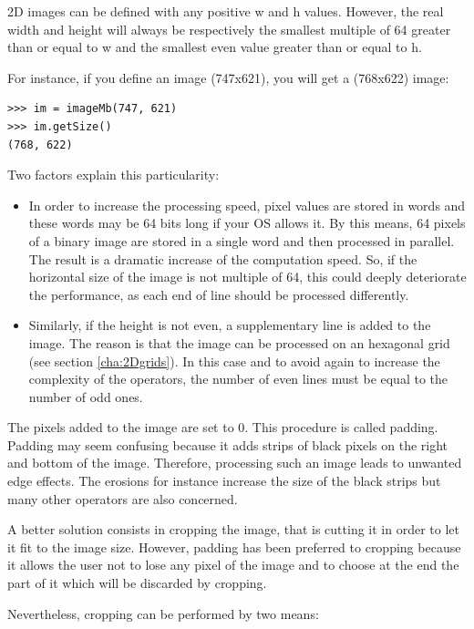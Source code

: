 \documentclass[a4paper,10pt,oneside]{article}
\begin{document}
2D images can be defined with any positive w and h values. However, the real width and height will
always be respectively the smallest multiple of 64 greater than or equal to w and the smallest even
value greater than or equal to h. 

For instance, if you define an image (747x621), you will get a (768x622) image:

\lstset{language=Python}
\begin{lstlisting}
>>> im = imageMb(747, 621)
>>> im.getSize()
(768, 622) 
\end{lstlisting}

Two factors explain this particularity:

\begin{itemize}
\item In order to increase the processing speed, pixel values are stored in words and these
words may be 64 bits long if your OS allows it. By this means, 64 pixels of a binary image
are stored in a single word and then processed in parallel. The result is a dramatic increase
of the computation speed. So, if the horizontal size of the image is not multiple of 64, this could
deeply deteriorate the performance, as each end of line should be processed differently. 
\item Similarly, if the height is not even, a supplementary line is added to the image. The
reason is that the image can be processed on an hexagonal grid (see section \ref{cha:2Dgrids}). In this case and to
avoid again to increase the complexity of the operators, the number of even lines must be equal to
the number of odd ones.
\end{itemize}

The pixels added to the image are set to 0. This procedure is called padding. Padding may seem confusing
because it adds strips of black pixels on the right and bottom of the image. Therefore, processing such an
image leads to unwanted edge effects. The erosions for instance increase the size of the black strips
but many other operators are also concerned.

A better solution consists in cropping the image, that is cutting it in order to let it fit to the image size.
However, padding has been preferred to cropping because it allows the user not to lose any pixel of the image
and to choose at the end the part of it which will be discarded by cropping.

Nevertheless, cropping can be performed by two means:
\end{document}
